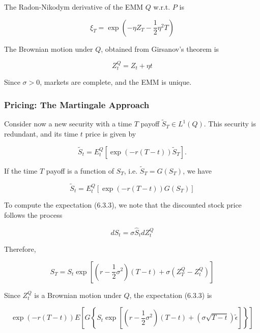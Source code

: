 \documentclass[\topdir/lecture\_notes.tex]{subfiles}
\begin{document}
The Radon-Nikodym derivative of the EMM $Q$ w.r.t. $P$ is

\begin{equation}
\xi_{T}=\exp \left(-\eta Z_{T}-\frac{1}{2} \eta^{2} T\right)
\end{equation}

The Brownian motion under $Q$, obtained from Girsanov's theorem is

\begin{equation}
Z_{t}^{Q}=Z_{t}+\eta t
\end{equation}

Since $\sigma>0$, markets are complete, and the EMM is unique.

\subsubsection{Pricing: The Martingale Approach}
Consider now a new security with a time $T$ payoff $\tilde{S}_{T} \in L^{1}(Q)$. This security is redundant, and its time $t$ price is given by

\begin{equation}
\tilde{S}_{t}=E_{t}^{Q}\left[\exp (-r(T-t)) \tilde{S}_{T}\right] .
\end{equation}

If the time $T$ payoff is a function of $S_{T}$, i.e. $\tilde{S}_{T}=G\left(S_{T}\right)$, we have

\begin{equation}
\tilde{S}_{t}=E_{t}^{Q}\left[\exp (-r(T-t)) G\left(S_{T}\right)\right] \label{eq:6.3.3}
\end{equation}

To compute the expectation (6.3.3), we note that the discounted stock price follows the process

\begin{equation}
d \hat{S}_{t}=\sigma \hat{S}_{t} d Z_{t}^{Q}
\end{equation}

Therefore,

\begin{equation*}
S_{T}=S_{t} \exp \left[\left(r-\frac{1}{2} \sigma^{2}\right)(T-t)+\sigma\left(Z_{T}^{Q}-Z_{t}^{Q}\right)\right]
\end{equation*}

Since $Z_{t}^{Q}$ is a Brownian motion under $Q$, the expectation (6.3.3) is

\begin{equation*}
\exp (-r(T-t)) E\left[G\left\{S_{t} \exp \left[\left(r-\frac{1}{2} \sigma^{2}\right)(T-t)+(\sigma \sqrt{T-t}) \tilde{\epsilon}\right]\right\}\right]
\end{equation*}
\end{document}

